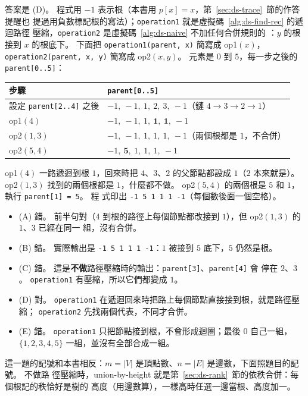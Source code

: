 答案是 (D)。 程式用 $-1$ 表示根（本書用 $p[x] = x$，第~\ref{sec:ds-trace}~節的作答提醒也
提過用負數標記根的寫法）；\texttt{operation1} 就是虛擬碼~\ref{alg:ds-find-rec} 的遞迴路徑
壓縮，\texttt{operation2} 是虛擬碼~\ref{alg:ds-naive} 不加任何合併規則的 ：$y$
的根接到 $x$ 的根底下。 下面把 \texttt{operation1(parent, x)} 簡寫成 op1$(x)$，
\texttt{operation2(parent, x, y)} 簡寫成 op2$(x, y)$。 元素是 $0$ 到 $5$，每一步之後的
\texttt{parent[0..5]}：
\begin{center}
\small
\begin{tabular}{ll}
\toprule
步驟 & \texttt{parent[0..5]} \\
\midrule
設定 \texttt{parent[2..4]} 之後 & $-1,\ -1,\ 1,\ 2,\ 3,\ -1$（鏈 $4 \to 3 \to 2 \to 1$） \\
op1$(4)$ & $-1,\ -1,\ 1,\ \mathbf{1},\ \mathbf{1},\ -1$ \\
op2$(1, 3)$ & $-1,\ -1,\ 1,\ 1,\ 1,\ -1$（兩個根都是 $1$，不合併） \\
op2$(5, 4)$ & $-1,\ \mathbf{5},\ 1,\ 1,\ 1,\ -1$ \\
\bottomrule
\end{tabular}
\end{center}
op1$(4)$ 一路遞迴到根 $1$，回來時把 $4$、$3$、$2$ 的父節點都設成 $1$（$2$ 本來就是）。
op2$(1, 3)$ 找到的兩個根都是 $1$，什麼都不做。 op2$(5, 4)$ 的兩個根是 $5$ 和 $1$，執行 \texttt{parent[1] = 5}。 程
式印出 \texttt{-1 5 1 1 1 -1}（每個數後面一個空格）。
\begin{itemize}
\item (A) 錯。 前半句對（$4$ 到根的路徑上每個節點都改接到 $1$），但 op2$(1, 3)$ 的 $1$、$3$ 已經在同一
組，沒有合併。
\item (B) 錯。 實際輸出是 \texttt{-1 5 1 1 1 -1}：$1$ 被接到 $5$ 底下，$5$ 仍然是根。
\item (C) 錯。 這是\textbf{不做}路徑壓縮時的輸出：\texttt{parent[3]}、\texttt{parent[4]} 會
停在 $2$、$3$。 \texttt{operation1} 有壓縮，所以它們都變成 $1$。
\item (D) 對。 \texttt{operation1} 在遞迴回來時把路上每個節點直接接到根，就是路徑壓縮；
\texttt{operation2} 先找兩個代表，不同才合併。
\item (E) 錯。 \texttt{operation1} 只把節點接到根，不會形成迴圈；最後 $0$ 自己一組，
$\{1, 2, 3, 4, 5\}$ 一組，並沒有全部合成一組。
\end{itemize}

這一題的記號和本書相反：$m = |V|$ 是頂點數、$n = |E|$ 是邊數，下面照題目的記號。 不做路
徑壓縮時，union-by-height 就是第~\ref{sec:ds-rank}~節的依秩合併：每個根記的秩恰好是樹的
高度（用邊數算），一樣高時任選一邊當根、高度加一。


